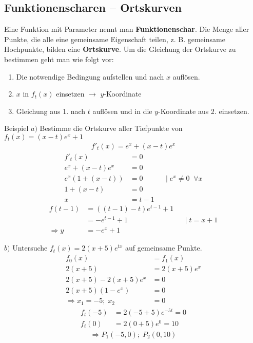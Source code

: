 \documentclass{article}
\begin{document}
\subsection{Funktionenscharen -- Ortskurven}
Eine Funktion mit Parameter nennt man \textbf{Funktionenschar}.
Die Menge aller Punkte, die alle eine gemeinsame Eigenschaft teilen, z. B.
gemeinsame Hochpunkte, bilden eine \textbf{Ortskurve}.
Um die Gleichung der Ortskurve zu bestimmen geht man wie folgt vor:
\begin{enumerate}
    \item Die notwendige Bedingung aufstellen und nach $x$ auflösen.
    \item $x$ in $f_t(x)$ einsetzen $\rightarrow$ $y$-Koordinate
    \item Gleichung aus 1. nach $t$ auflösen und in die $y$-Koordinate aus 2. einsetzen.
\end{enumerate}
\begin{boxx}[DarkBlue]{Beispiel}
    $a)$\hspace{3mm} Bestimme die Ortskurve aller Tiefpunkte von $\displaystyle f_t(x) = (x-t)e^x + 1$
    \begin{align*}
        f'_t(x) = e^x + (x-t)e^x
    \end{align*}
    \begin{align*}
        f'_t(x) &= 0 \\
        e^x + (x-t)e^x &= 0 \\
        e^x\left(1 + (x-t)\right) &= 0 & &|\; e^x \not = 0 \;\;\forall x\\
        1 + (x-t) &= 0 \\
        x &= t-1
    \end{align*}
    \begin{align*}
        f(t-1) &= \left((t-1)-t\right)e^{t-1} + 1 \\
        &= -e^{t-1} + 1 & &|\; t = x+1 \\
        \Rightarrow y &= -e^x + 1
    \end{align*}

    $b)$\hspace{3mm} Untersuche $\displaystyle f_t(x) = 2(x+5)e^{tx}$ auf gemeinsame Punkte.
    \begin{align*}
        f_0(x) &= f_1(x) \\
        2(x+5) &= 2(x+5)e^{x} \\
        2(x+5) - 2(x+5)e^{x} &= 0 \\
        2(x+5)(1 - e^x) &= 0 \\
        \Rightarrow x_1 = -5;\; x_2 &= 0
    \end{align*}
    \begin{align*}
        f_t(-5) &= 2(-5+5)e^{-5t} = 0 \\
        f_t(0) &= 2(0+5)e^{0} = 10
    \end{align*}
    \begin{align*}
        \Rightarrow P_1(-5,0);\; P_2(0,10)
    \end{align*}
\end{boxx}
\end{document}
